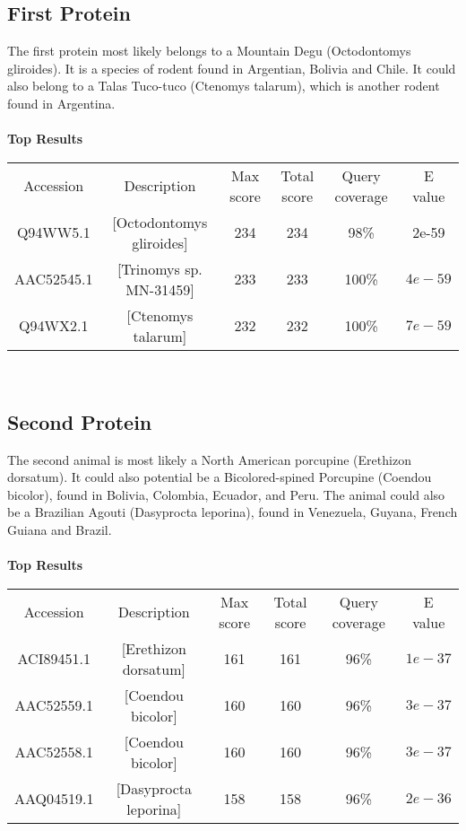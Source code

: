 \documentclass[12pt]{article}
\begin{document}
		\subsection{First Protein}
		The first protein most likely belongs to a Mountain Degu (Octodontomys gliroides). It is a species of rodent found in Argentian, Bolivia and Chile. It could also belong to a Talas Tuco-tuco (Ctenomys talarum), which is another rodent found in Argentina.
		\\ \\
		\textbf{Top Results} \\
		\scriptsize
		\begin{tabular}{|c|c|c|c|c|c|}
			\hline
			Accession	&	Description	&	Max score	&	Total score	&	Query coverage	&	E value \\
	Q94WW5.1	&	[Octodontomys gliroides]	&	234	&	234	&	98\%	&	2e-59 \\	
	AAC52545.1	&	[Trinomys sp. MN-31459]	&	233	&	233	&	100\%	&	$4e-59$ \\
	Q94WX2.1	&	[Ctenomys talarum]	&	232	&	232	&	100\%	&	$7e-59$ \\
			\hline
		\end{tabular} \\
		\normalsize

		\subsection{Second Protein}
		The second animal is most likely a North American porcupine (Erethizon dorsatum). It could also potential be a Bicolored-spined Porcupine (Coendou bicolor), found in Bolivia, Colombia, Ecuador, and Peru. The animal could also be a Brazilian Agouti (Dasyprocta leporina), found in Venezuela, Guyana, French Guiana and Brazil.
		\\ \\ 
		\textbf{Top Results} \\
		\scriptsize
		\begin{tabular}{|c|c|c|c|c|c|}
			\hline
			Accession	&	Description	&	Max score	&	Total score	&	Query coverage	&	E value \\
			ACI89451.1	&	[Erethizon dorsatum]	&	161	&	161	&	96\%	&	$1e-37$ \\
			AAC52559.1	&	[Coendou bicolor]	&	160	&	160	&	96\%	&	$3e-37$ \\
			AAC52558.1 	&	[Coendou bicolor]	&	160	&	160	&	96\%	&	$3e-37$ \\
			AAQ04519.1	&	[Dasyprocta leporina]	&	158	&	158	&	96\%	&	$2e-36$ \\
			\hline
		\end{tabular} \\
		\normalsize
\end{document}
